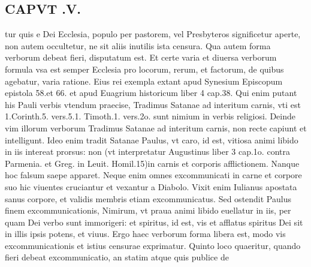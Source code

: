 \documentclass{article}
\begin{document}
\begin{pages}
\section*{CAPVT .V. }
\marginpar{[ p.397 ]}\pstart tur quis e Dei Ecclesia, populo per pastorem, vel Presbyteros significetur aperte, non autem occultetur, ne sit aliis inutilis ista censura. Qua autem forma verborum debeat fieri, disputatum est. Et certe varia et diuersa verborum formula vsa est semper Ecclesia pro locorum, rerum, et factorum, de quibus agebatur, varia ratione. Eius rei exempla extant apud Synesium Episcopum epistola 58.et 66. et apud Euagrium historicum liber 4 cap.38. Qui enim putant his Pauli verbis vtendum praecise, Tradimus Satanae ad interitum carnis, vti est 1.Corinth.5. vers.5.1. Timoth.1. vers.2o. sunt nimium in verbis religiosi. Deinde vim illorum verborum Tradimus Satanae ad interitum carnis, non recte capiunt et intelligunt. Ideo enim tradit Satanae Paulus, vt caro, id est, vitiosa animi libido in iis intereat prorsus: non (vt interpretatur Augustinus liber 3 cap.1o. contra Parmenia. et Greg. in Leuit. Homil.15)in carnis et corporis afflictionem. Nanque  hoc falsum saepe apparet. Neque enim omnes excommunicati in carne et corpore suo hic viuentes cruciantur et vexantur a Diabolo. Vixit enim Iulianus apostata sanus corpore, et validis membris etiam excommunicatus. Sed ostendit Paulus finem excommunicationis, Nimirum, vt praua animi libido euellatur in iis, per quam Dei verbo sunt immorigeri: et spiritus, id est, vis et afflatus spiritus Dei sit in illis ipsis potens, et viuus. Ergo haec verborum forma libera est, modo vis excommunicationis et istius censurae exprimatur.  \pend\pstart Quinto loco quaeritur, quando fieri debeat excommunicatio, an statim atque quis publice de  \pend

\end{pages}
\end{document}
